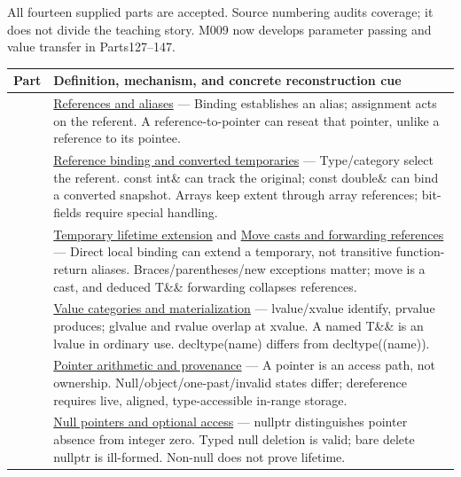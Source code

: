 All fourteen supplied parts are accepted. Source numbering audits coverage; it does not divide the teaching story. M009 now develops parameter passing and value transfer in Parts127--147.

{\def\LTcaptype{none} %
\begin{longtable}[]{@{}
  >{\raggedright\arraybackslash}p{}
  >{\raggedright\arraybackslash}p{}@{}}
\toprule\noalign{}
\begin{minipage}[b]{\linewidth}\raggedright
Part
\end{minipage} & \begin{minipage}[b]{\linewidth}\raggedright
Definition, mechanism, and concrete reconstruction cue
\end{minipage} \\
\midrule\noalign{}
\endhead
\bottomrule\noalign{}
\endlastfoot
113 & \hyperref[appendix-d6d562ca9fbb]{References and aliases} --- Binding establishes an alias; assignment acts on the referent. A reference-to-pointer can reseat that pointer, unlike a reference to its pointee. \\
114 & \hyperref[appendix-37856d997bb0]{Reference binding and converted temporaries} --- Type/category select the referent. const int\& can track the original; const double\& can bind a converted snapshot. Arrays keep extent through array references; bit-fields require special handling. \\
115 & \hyperref[appendix-a978b29bbbb0]{Temporary lifetime extension} and \hyperref[appendix-0104b704fb11]{Move casts and forwarding references} --- Direct local binding can extend a temporary, not transitive function-return aliases. Braces/parentheses/new exceptions matter; move is a cast, and deduced T\&\& forwarding collapses references. \\
116 & \hyperref[appendix-1121b30eaeb0]{Value categories and materialization} --- lvalue/xvalue identify, prvalue produces; glvalue and rvalue overlap at xvalue. A named T\&\& is an lvalue in ordinary use. decltype(name) differs from decltype((name)). \\
117 & \hyperref[appendix-6af5921bc853]{Pointer arithmetic and provenance} --- A pointer is an access path, not ownership. Null/object/one-past/invalid states differ; dereference requires live, aligned, type-accessible in-range storage. \\
118 & \hyperref[appendix-afae48c31800]{Null pointers and optional access} --- nullptr distinguishes pointer absence from integer zero. Typed null deletion is valid; bare delete nullptr is ill-formed. Non-null does not prove lifetime. \\

\end{longtable}}
